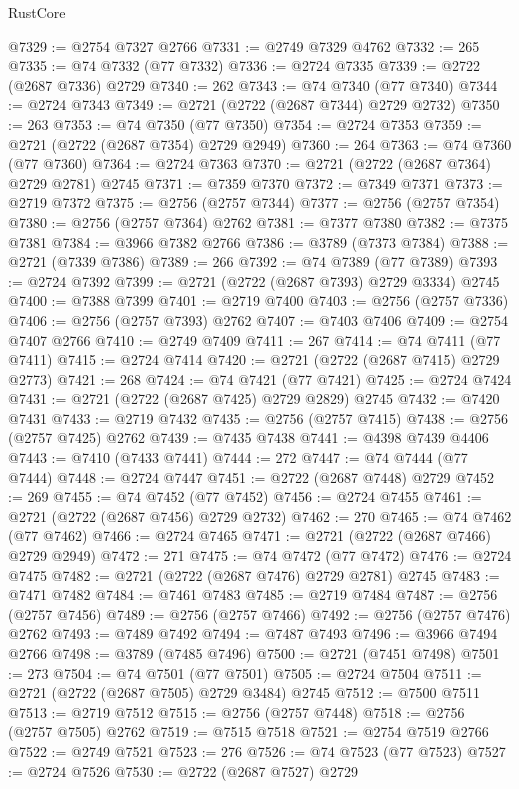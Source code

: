 \begin{lexlean}{RustCore}
\begin{coremodule}
@7329 := @2754 @7327 @2766
@7331 := @2749 @7329 @4762
@7332 := 265
@7335 := @74 @7332 (@77 @7332)
@7336 := @2724 @7335
@7339 := @2722 (@2687 @7336) @2729
@7340 := 262
@7343 := @74 @7340 (@77 @7340)
@7344 := @2724 @7343
@7349 := @2721 (@2722 (@2687 @7344) @2729 @2732)
@7350 := 263
@7353 := @74 @7350 (@77 @7350)
@7354 := @2724 @7353
@7359 := @2721 (@2722 (@2687 @7354) @2729 @2949)
@7360 := 264
@7363 := @74 @7360 (@77 @7360)
@7364 := @2724 @7363
@7370 := @2721 (@2722 (@2687 @7364) @2729 @2781) @2745
@7371 := @7359 @7370
@7372 := @7349 @7371
@7373 := @2719 @7372
@7375 := @2756 (@2757 @7344)
@7377 := @2756 (@2757 @7354)
@7380 := @2756 (@2757 @7364) @2762
@7381 := @7377 @7380
@7382 := @7375 @7381
@7384 := @3966 @7382 @2766
@7386 := @3789 (@7373 @7384)
@7388 := @2721 (@7339 @7386)
@7389 := 266
@7392 := @74 @7389 (@77 @7389)
@7393 := @2724 @7392
@7399 := @2721 (@2722 (@2687 @7393) @2729 @3334) @2745
@7400 := @7388 @7399
@7401 := @2719 @7400
@7403 := @2756 (@2757 @7336)
@7406 := @2756 (@2757 @7393) @2762
@7407 := @7403 @7406
@7409 := @2754 @7407 @2766
@7410 := @2749 @7409
@7411 := 267
@7414 := @74 @7411 (@77 @7411)
@7415 := @2724 @7414
@7420 := @2721 (@2722 (@2687 @7415) @2729 @2773)
@7421 := 268
@7424 := @74 @7421 (@77 @7421)
@7425 := @2724 @7424
@7431 := @2721 (@2722 (@2687 @7425) @2729 @2829) @2745
@7432 := @7420 @7431
@7433 := @2719 @7432
@7435 := @2756 (@2757 @7415)
@7438 := @2756 (@2757 @7425) @2762
@7439 := @7435 @7438
@7441 := @4398 @7439 @4406
@7443 := @7410 (@7433 @7441)
@7444 := 272
@7447 := @74 @7444 (@77 @7444)
@7448 := @2724 @7447
@7451 := @2722 (@2687 @7448) @2729
@7452 := 269
@7455 := @74 @7452 (@77 @7452)
@7456 := @2724 @7455
@7461 := @2721 (@2722 (@2687 @7456) @2729 @2732)
@7462 := 270
@7465 := @74 @7462 (@77 @7462)
@7466 := @2724 @7465
@7471 := @2721 (@2722 (@2687 @7466) @2729 @2949)
@7472 := 271
@7475 := @74 @7472 (@77 @7472)
@7476 := @2724 @7475
@7482 := @2721 (@2722 (@2687 @7476) @2729 @2781) @2745
@7483 := @7471 @7482
@7484 := @7461 @7483
@7485 := @2719 @7484
@7487 := @2756 (@2757 @7456)
@7489 := @2756 (@2757 @7466)
@7492 := @2756 (@2757 @7476) @2762
@7493 := @7489 @7492
@7494 := @7487 @7493
@7496 := @3966 @7494 @2766
@7498 := @3789 (@7485 @7496)
@7500 := @2721 (@7451 @7498)
@7501 := 273
@7504 := @74 @7501 (@77 @7501)
@7505 := @2724 @7504
@7511 := @2721 (@2722 (@2687 @7505) @2729 @3484) @2745
@7512 := @7500 @7511
@7513 := @2719 @7512
@7515 := @2756 (@2757 @7448)
@7518 := @2756 (@2757 @7505) @2762
@7519 := @7515 @7518
@7521 := @2754 @7519 @2766
@7522 := @2749 @7521
@7523 := 276
@7526 := @74 @7523 (@77 @7523)
@7527 := @2724 @7526
@7530 := @2722 (@2687 @7527) @2729

\end{coremodule}
\end{lexlean}
